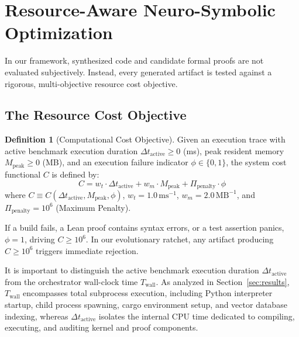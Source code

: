\documentclass[10pt,twocolumn,letterpaper]{article}
\theoremstyle{definition}
\newtheorem{definition}{Definition}
\begin{document}
\section{Resource-Aware Neuro-Symbolic Optimization}
\label{sec:anse_physics}

In our framework, synthesized code and candidate formal proofs are not evaluated subjectively. Instead, every generated artifact is tested against a rigorous, multi-objective resource cost objective.

\subsection{The Resource Cost Objective}
\begin{definition}[Computational Cost Objective]
Given an execution trace with active benchmark execution duration $\Delta t_{\text{active}} \ge 0$ (ms), peak resident memory $M_{\text{peak}} \ge 0$ (MB), and an execution failure indicator $\phi \in \{0, 1\}$, the system cost functional $C$ is defined by:
\begin{equation}
    C = w_t \cdot \Delta t_{\text{active}} + w_m \cdot M_{\text{peak}} + \Pi_{\text{penalty}} \cdot \phi
\end{equation}
where $C \equiv C(\Delta t_{\text{active}}, M_{\text{peak}}, \phi)$, $w_t = 1.0\,\text{ms}^{-1}$, $w_m = 2.0\,\text{MB}^{-1}$, and $\Pi_{\text{penalty}} = 10^6$ (Maximum Penalty).
\end{definition}

If a build fails, a Lean proof contains syntax errors, or a test assertion panics, $\phi = 1$, driving $C \ge 10^6$. In our evolutionary ratchet, any artifact producing $C \ge 10^6$ triggers immediate rejection. 

It is important to distinguish the active benchmark execution duration $\Delta t_{\text{active}}$ from the orchestrator wall-clock time $T_{\text{wall}}$. As analyzed in Section~\ref{sec:results}, $T_{\text{wall}}$ encompasses total subprocess execution, including Python interpreter startup, child process spawning, cargo environment setup, and vector database indexing, whereas $\Delta t_{\text{active}}$ isolates the internal CPU time dedicated to compiling, executing, and auditing kernel and proof components.
\end{document}
